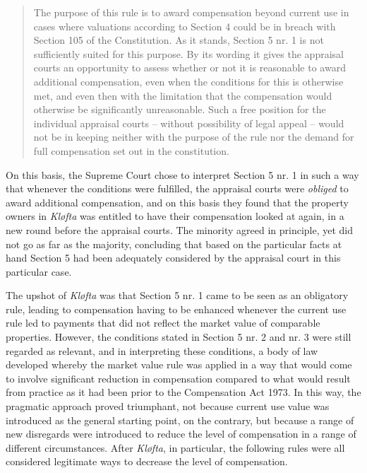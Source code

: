 \begin{quote}
The purpose of this rule is to award compensation beyond current use in cases where valuations according to Section 4 could be in breach with Section 105 of the Constitution. As it stands, Section 5 nr. 1 is not sufficiently suited for this purpose. By its wording it gives the appraisal courts an opportunity to assess whether or not it is reasonable to award additional compensation, even when the conditions for this is otherwise met, and even then with the limitation that the compensation would otherwise be significantly unreasonable. Such a free position for the individual appraisal courts -- without possibility of legal appeal -- would not be in keeping neither with the purpose of the rule nor the demand for full compensation set out in the constitution.
\end{quote}

On this basis, the Supreme Court chose to interpret Section 5 nr. 1 in such a way that whenever the conditions were fulfilled, the appraisal courts were \emph{obliged} to award additional compensation, and on this basis they found that the property owners in \emph{Kløfta} was entitled to have their compensation looked at again, in a new round before the appraisal courts. The minority agreed in principle, yet did not go as far as the majority, concluding that based on the particular facts at hand Section 5 had been adequately considered by the appraisal court in this particular case.

The upshot of \emph{Kløfta} was that Section 5 nr. 1 came to be seen as an obligatory rule, leading to compensation having to be enhanced whenever the current use rule led to payments that did not reflect the market value of comparable properties. However, the conditions stated in Section 5 nr. 2 and nr. 3 were still regarded as relevant, and in interpreting these conditions, a body of law developed whereby the market value rule was applied in a way that would come to involve significant reduction in compensation compared to what would result from practice as it had been prior to the Compensation Act 1973. In this way, the pragmatic approach proved triumphant, not because current use value was introduced as the general starting point, on the contrary, but because a range of new disregards were introduced to reduce the level of compensation in a range of different circumstances. After \emph{Kløfta}, in particular, the following rules were all considered legitimate ways to decrease the level of compensation.

